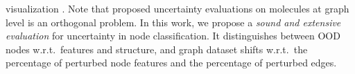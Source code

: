 visualization \citep{Borovitskiy2020}. Note that proposed uncertainty evaluations on molecules at graph level \citep{Zhang2019, Ryu2019, Akita2018, uncertainty-nn-molecules, uncertainty-material-prediction} is an orthogonal problem. In this work, we propose a \emph{sound and extensive evaluation} for uncertainty in node classification. It distinguishes between OOD nodes w.r.t.\ features and structure, and graph dataset shifts w.r.t.\ the percentage of perturbed node features and the percentage of perturbed edges.
